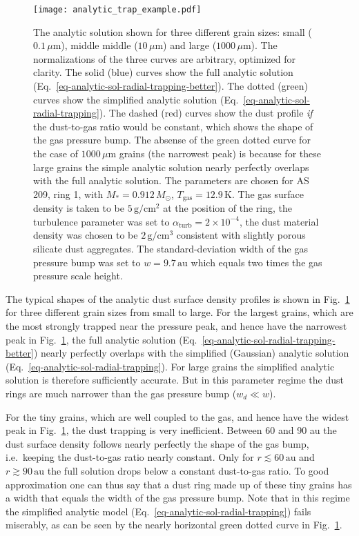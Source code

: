 \documentclass{aa}
\begin{document}
\begin{figure}
\centerline{\texttt{[image: analytic\_trap\_example.pdf]}}
\caption{\label{fig-analytic-model-example}The analytic solution shown for three
  different grain sizes: small ($0.1\,\mu\mathrm{m}$), middle middle
  ($10\,\mu\mathrm{m}$) and large ($1000\,\mu\mathrm{m}$). The normalizations of
  the three curves are arbitrary, optimized for clarity. The solid (blue) curves
  show the full analytic solution
  (Eq.~\ref{eq-analytic-sol-radial-trapping-better}).  The dotted (green) curves
  show the simplified analytic solution
  (Eq.~\ref{eq-analytic-sol-radial-trapping}). The dashed (red) curves show the
  dust profile {\em if} the dust-to-gas ratio would be constant, which shows the
  shape of the gas pressure bump. The absense of the green dotted curve for the
  case of $1000\,\mu\mathrm{m}$ grains (the narrowest peak) is because for these
  large grains the simple analytic solution nearly perfectly overlaps with the
  full analytic solution. The parameters are chosen for AS 209, ring 1,
  with $M_{*}=0.912\,M_{\odot}$, $T_{\mathrm{gas}}=12.9\,\mathrm{K}$. The gas
  surface density is taken to be $5\,\mathrm{g}/\mathrm{cm}^2$ at the position
  of the ring, the turbulence parameter was set to
  $\alpha_{\mathrm{turb}}=2\times 10^{-4}$, the dust material density was chosen
  to be $2\,\mathrm{g}/\mathrm{cm}^3$ consistent with slightly porous silicate
  dust aggregates. The standard-deviation width of the gas pressure bump was set
  to $w=9.7\,\mathrm{au}$ which equals two times the gas pressure scale height.}
\end{figure}

The typical shapes of the analytic dust surface density profiles is shown in
Fig.~\ref{fig-analytic-model-example} for three different grain sizes from small
to large. For the largest grains, which are the most strongly trapped near the
pressure peak, and hence have the narrowest peak in
Fig.~\ref{fig-analytic-model-example}, the full analytic solution
(Eq.~\ref{eq-analytic-sol-radial-trapping-better}) nearly perfectly overlaps
with the simplified (Gaussian) analytic solution
(Eq.~\ref{eq-analytic-sol-radial-trapping}). For large grains the simplified
analytic solution is therefore sufficiently accurate. But in this parameter
regime the dust rings are much narrower than the gas pressure bump ($w_d\ll w$).

For the tiny grains, which are well coupled to the gas, and hence have the
widest peak in Fig.~\ref{fig-analytic-model-example}, the dust trapping is very
inefficient. Between 60 and 90 au the dust surface density follows nearly
perfectly the shape of the gas bump, i.e.\ keeping the dust-to-gas ratio nearly
constant. Only for $r\lesssim 60\,\mathrm{au}$ and $r\gtrsim 90\,\mathrm{au}$
the full solution drops below a constant dust-to-gas ratio. To good approximation
one can thus say that a dust ring made up of these tiny grains has a width
that equals the width of the gas pressure bump. Note that in this regime the
simplified analytic model (Eq.~\ref{eq-analytic-sol-radial-trapping}) fails
miserably, as can be seen by the nearly horizontal green dotted curve in
Fig.~\ref{fig-analytic-model-example}.
\end{document}

